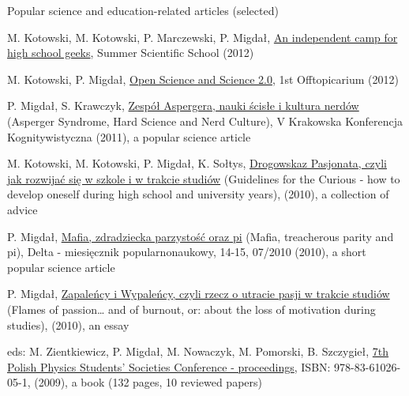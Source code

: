 \documentclass[margin,line]{resume}
\begin{document}
\begin{resume}
    Popular science and education-related articles (selected)
    \begin{list2}
        \item M. Kotowski, M. Kotowski, P. Marczewski, P. Migdał, \href{http://warsztatywww.wikidot.com/en:indie-camp-for-hs-geeks}{An independent camp for high school geeks}, Summer Scientific School (2012)
        \item M. Kotowski, P. Migdał, \href{http://offtopicarium.wikidot.com/v1:open-science-2-0}{Open Science and Science 2.0}, 1st Offtopicarium (2012)
        \item P. Migdał, S. Krawczyk, \href{http://migdal.wikidot.com/local--files/nerdowska-duma/Migdal_Krawczyk__Zespol_Aspergera_preprint_after_vkkk.pdf}{Zespół Aspergera, nauki ścisłe i kultura nerdów} (Asperger Syndrome, Hard Science and Nerd Culture), V Krakowska Konferencja Kognitywistyczna (2011), a popular science article
		\item M. Kotowski, M. Kotowski, P. Migdał, K. Sołtys, \href{http://warsztatywww.wikidot.com/drogowskaz-pasjonata}{Drogowskaz Pasjonata, czyli jak rozwijać się w szkole i w trakcie studiów} (Guidelines for the Curious - how to develop oneself during high school and university years), (2010), a collection of advice
		\item P. Migdał, \href{http://www.mimuw.edu.pl/delta/artykuly/delta2010-07/2010-07-6.pdf}{Mafia, zdradziecka parzystość oraz pi} (Mafia, treacherous parity and pi), Delta - miesięcznik popularnonaukowy, 14-15, 07/2010 (2010), a short popular science article
		\item P. Migdał, \href{http://migdal.wikidot.com/zapalency-i-wypalency}{Zapaleńcy i Wypaleńcy, czyli rzecz o utracie pasji w trakcie studiów} (Flames of passion… and of burnout, or: about the loss of motivation during studies), (2010), an essay
		\item eds: M. Zientkiewicz, P. Migdał, M. Nowaczyk, M. Pomorski, B. Szczygieł, \href{http://skfiz.fuw.edu.pl/vii-osknf:proceedings}{7th Polish Physics Students' Societies Conference - proceedings}, ISBN: 978-83-61026-05-1, (2009), a book (132 pages, 10 reviewed papers)
    \end{list2}




\end{resume}
\end{document}
